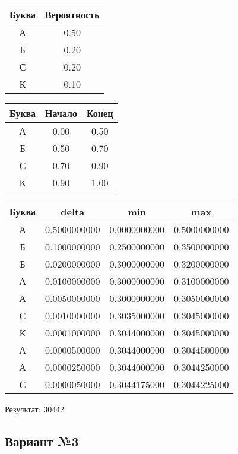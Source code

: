 \documentclass[a4paper, 12pt]{article}
\begin{document}
\begin{center}
 \begin{tabular}{ |c|c| } 
  \hline
     Буква & Вероятность \\ \hline
А & 0.50\\\hline
Б & 0.20\\\hline
С & 0.20\\\hline
К & 0.10
\\ \hline \end{tabular}
\end{center}
\begin{center}
 \begin{tabular}{ |c|c|c| } 
  \hline
     Буква & Начало & Конец \\ \hline
А & 0.00 & 0.50\\\hline
Б & 0.50 & 0.70\\\hline
С & 0.70 & 0.90\\\hline
К & 0.90 & 1.00
\\ \hline \end{tabular}
\end{center}
\begin{center}
 \begin{tabular}{ |c|c|c|c| } 
  \hline
     Буква & delta & min & max \\ \hline
А & 0.5000000000 & 0.0000000000 & 0.5000000000\\\hline
Б & 0.1000000000 & 0.2500000000 & 0.3500000000\\\hline
Б & 0.0200000000 & 0.3000000000 & 0.3200000000\\\hline
А & 0.0100000000 & 0.3000000000 & 0.3100000000\\\hline
А & 0.0050000000 & 0.3000000000 & 0.3050000000\\\hline
С & 0.0010000000 & 0.3035000000 & 0.3045000000\\\hline
К & 0.0001000000 & 0.3044000000 & 0.3045000000\\\hline
А & 0.0000500000 & 0.3044000000 & 0.3044500000\\\hline
А & 0.0000250000 & 0.3044000000 & 0.3044250000\\\hline
С & 0.0000050000 & 0.3044175000 & 0.3044225000
\\ \hline \end{tabular}
\end{center}
Результат: 30442
\pagebreak
\subsection{Вариант №3}
\end{document}
